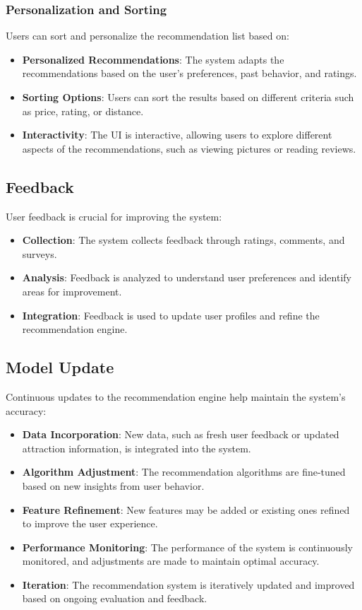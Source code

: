 \subsubsection{Personalization and Sorting}
Users can sort and personalize the recommendation list based on:
\begin{itemize}
    \item \textbf{Personalized Recommendations}: The system adapts the recommendations based on the user’s preferences, past behavior, and ratings.
    \item \textbf{Sorting Options}: Users can sort the results based on different criteria such as price, rating, or distance.
    \item \textbf{Interactivity}: The UI is interactive, allowing users to explore different aspects of the recommendations, such as viewing pictures or reading reviews.
\end{itemize}

\subsection{Feedback}
User feedback is crucial for improving the system:
\begin{itemize}
    \item \textbf{Collection}: The system collects feedback through ratings, comments, and surveys.
    \item \textbf{Analysis}: Feedback is analyzed to understand user preferences and identify areas for improvement.
    \item \textbf{Integration}: Feedback is used to update user profiles and refine the recommendation engine.
\end{itemize}

\subsection{Model Update}
Continuous updates to the recommendation engine help maintain the system's accuracy:
\begin{itemize}
    \item \textbf{Data Incorporation}: New data, such as fresh user feedback or updated attraction information, is integrated into the system.
    \item \textbf{Algorithm Adjustment}: The recommendation algorithms are fine-tuned based on new insights from user behavior.
    \item \textbf{Feature Refinement}: New features may be added or existing ones refined to improve the user experience.
    \item \textbf{Performance Monitoring}: The performance of the system is continuously monitored, and adjustments are made to maintain optimal accuracy.
    \item \textbf{Iteration}: The recommendation system is iteratively updated and improved based on ongoing evaluation and feedback.
\end{itemize}

